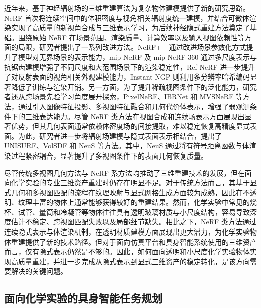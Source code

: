 近年来，基于神经辐射场的三维重建算法为复杂物体建模提供了新的研究思路。NeRF\cite{mildenhall2020nerf} 首次将连续空间中的体积密度与视角相关辐射度统一建模，并结合可微体渲染实现了高质量的新视角合成与三维表示学习，为后续神经隐式重建方法奠定了基础。围绕原始 NeRF 在场景范围、渲染质量、计算效率以及输入视图依赖性等方面的局限，研究者提出了一系列改进方法。NeRF++\cite{zhang2020nerfplusplus} 通过改进场景参数化方式提升了模型对无界场景的表示能力，mip-NeRF\cite{barron2021mipnerf} 及 mip-NeRF 360\cite{barron2022mipnerf360} 通过多尺度表示与抗锯齿建模增强了不同尺度和大范围场景下的渲染稳定性，Ref-NeRF\cite{verbin2022refnerf} 进一步提升了对反射表面的视角相关外观建模能力，Instant-NGP\cite{muller2022instantngp} 则利用多分辨率哈希编码显著降低了训练与渲染开销。另一方面，为了提升稀疏视图条件下的泛化能力，研究者还从跨场景先验学习角度展开探索，PixelNeRF\cite{yu2021pixelnerf}、IBRNet\cite{wang2021ibrnet} 和 MVSNeRF\cite{chen2021mvsnerf} 等方法，通过引入图像特征投影、多视图特征融合和几何代价体表示，增强了弱观测条件下的三维表达能力。尽管 NeRF 类方法在视图合成和连续场表示方面展现出显著优势，但其几何表面通常依赖体密度场的间接提取，难以稳定恢复高精度显式表面。为此，研究者进一步将辐射场建模与隐式表面表示相结合，提出了 UNISURF\cite{oechsle2021unisurf}、VolSDF\cite{yariv2021volsdf} 和 NeuS\cite{wang2021neus} 等方法。其中，NeuS 通过将有符号距离函数与体渲染过程紧密耦合，显著提升了多视图条件下的表面几何恢复质量。

尽管传统多视图几何方法与 NeRF 系方法均推动了三维重建技术的发展，但在面向化学实验的专业三维资产重建时仍存在明显不足。对于传统方法而言，其基于显式几何和多视图匹配的流程在纹理映射与显式网格生成方面较为成熟，因此在不透明、纹理丰富的物体上通常能够获得较好的重建结果。然而，化学实验中常见的烧杯、试管、量筒和冷凝管等物体往往具有透明玻璃材质与小尺度结构，容易导致深度估计不稳定、跨视图匹配失败以及局部细节缺失。相比之下，NeRF 类方法通过连续隐式表示与体渲染机制，在透明材质建模方面展现出更大潜力，为化学实验物体重建提供了新的技术路径。但对于面向仿真平台和具身智能系统使用的三维资产而言，仅有隐式表示仍然是不够的。因此，如何面向透明和小尺度化学实验物体实现高质量重建，并进一步完成从隐式表示到显式三维资产的稳定转化，是该方向需要解决的关键问题。


\subsection{面向化学实验的具身智能任务规划}
\label{subsec:embodied_planning}

